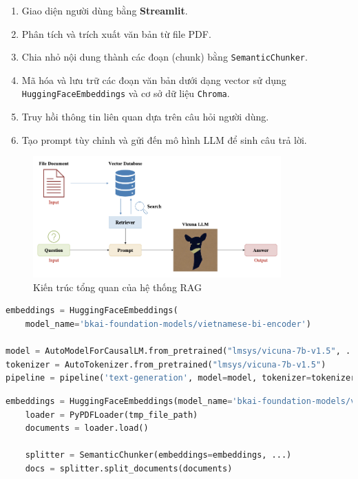 \documentclass[11pt]{article}
\begin{document}
\begin{enumerate}
    \item Giao diện người dùng bằng \textbf{Streamlit}.
    \item Phân tích và trích xuất văn bản từ file PDF.
    \item Chia nhỏ nội dung thành các đoạn (chunk) bằng \texttt{SemanticChunker}.
    \item Mã hóa và lưu trữ các đoạn văn bản dưới dạng vector sử dụng \texttt{HuggingFaceEmbeddings} và cơ sở dữ liệu \texttt{Chroma}.
    \item Truy hồi thông tin liên quan dựa trên câu hỏi người dùng.
    \item Tạo prompt tùy chỉnh và gửi đến mô hình LLM để sinh câu trả lời.
\end{enumerate}

\begin{figure}[H]
    \centering
    \includegraphics[width=0.85\textwidth]{architecture.png}
    \caption{Kiến trúc tổng quan của hệ thống RAG}
\end{figure}

\begin{lstlisting}[language=Python]
embeddings = HuggingFaceEmbeddings(
    model_name='bkai-foundation-models/vietnamese-bi-encoder')

model = AutoModelForCausalLM.from_pretrained("lmsys/vicuna-7b-v1.5", ...)
tokenizer = AutoTokenizer.from_pretrained("lmsys/vicuna-7b-v1.5")
pipeline = pipeline('text-generation', model=model, tokenizer=tokenizer)
\end{lstlisting}

\begin{lstlisting}[language=Python]
	embeddings = HuggingFaceEmbeddings(model_name='bkai-foundation-models/vietnamese-bi-encoder')
	loader = PyPDFLoader(tmp_file_path)
	documents = loader.load()

	splitter = SemanticChunker(embeddings=embeddings, ...)
	docs = splitter.split_documents(documents)
\end{lstlisting}
\end{document}
